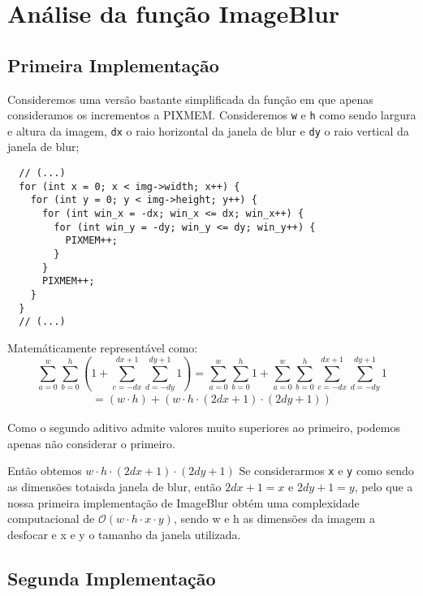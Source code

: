 \chapter[ImageBlur]{Análise da função ImageBlur}

\section{Primeira Implementação}
Consideremos uma versão bastante simplificada da função em que apenas consideramos os incrementos a PIXMEM. Consideremos
\verb|w| e \verb|h| como sendo largura e altura da imagem,
\verb|dx| o raio horizontal da janela de blur e \verb|dy| o
raio vertical da janela de blur;
\begin{listing}[H]
	\centering
	\begin{verbatim}
  // (...) 
  for (int x = 0; x < img->width; x++) {
    for (int y = 0; y < img->height; y++) {
      for (int win_x = -dx; win_x <= dx; win_x++) {
        for (int win_y = -dy; win_y <= dy; win_y++) {
          PIXMEM++;
        }
      }
      PIXMEM++;
    }
  }
  // (...)
\end{verbatim}
\end{listing}

Matemáticamente representável como:
\\
\begin{equation}
	\sum_{a=0}^{w}\sum_{b=0}^{h} (1 + \sum_{c=-dx}^{dx+1}\sum_{d=-dy}^{dy+1} 1)
	= \sum_{a=0}^{w}\sum_{b=0}^{h} 1 +
	\sum_{a=0}^{w}\sum_{b=0}^{h}
	\sum_{c=-dx}^{dx+1}\sum_{d=-dy}^{dy+1} 1
\end{equation}
\begin{align*}
	= (w \cdot h) + (w \cdot h \cdot (2dx + 1) \cdot (2dy + 1))
\end{align*}

Como o segundo aditivo admite valores muito superiores ao
primeiro, podemos apenas não considerar o primeiro.

Então obtemos $w\cdot h \cdot (2dx + 1) \cdot (2dy + 1)$
Se considerarmos \verb|x| e \verb|y| como sendo as dimensões totaisda janela de blur, então $2dx + 1 = x$ e $2dy + 1 = y$,
pelo que a nossa primeira implementação de ImageBlur obtém
uma complexidade computacional de $\mathcal{O}(w\cdot h\cdot
	x\cdot y)$, sendo w e h as dimensões da imagem a desfocar e
x e y o tamanho da janela utilizada.



\section{Segunda Implementação}
